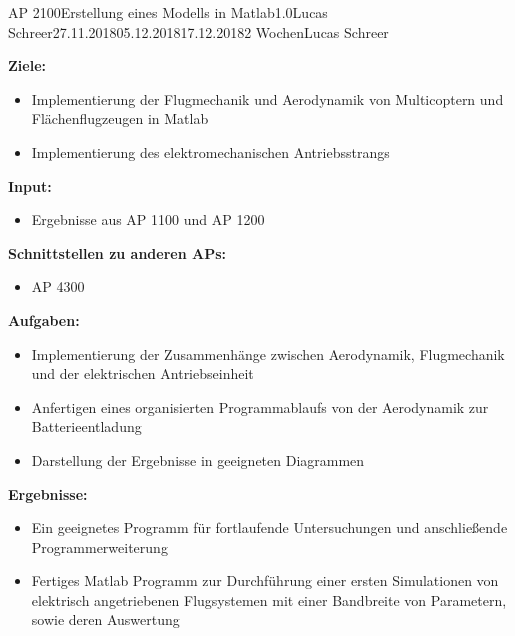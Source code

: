 \clearpage
\begin{wpd}{AP 2100}{Erstellung eines Modells in Matlab}{1.0}{Lucas Schreer}{27.11.2018}{05.12.2018}{17.12.2018}{2 Wochen}{Lucas Schreer}
    {
    \textbf{Ziele:}
    \begin{itemize}
        \item Implementierung der Flugmechanik und Aerodynamik von Multicoptern und Flächenflugzeugen in Matlab
        \item Implementierung des elektromechanischen Antriebsstrangs
    \end{itemize}
    \textbf{Input:}
    \begin{itemize}
        \item Ergebnisse aus AP 1100 und AP 1200
    \end{itemize}
    \textbf{Schnittstellen zu anderen APs:}
    \begin{itemize}
        \item AP 4300
    \end{itemize}
    \textbf{Aufgaben:}
    \begin{itemize}
    	\item Implementierung der Zusammenhänge zwischen Aerodynamik, Flugmechanik und der elektrischen Antriebseinheit
    	\item Anfertigen eines organisierten Programmablaufs von der Aerodynamik zur Batterieentladung
    	\item Darstellung der Ergebnisse in geeigneten Diagrammen
    \end{itemize}
    \textbf{Ergebnisse:}
    \begin{itemize}
        \item Ein geeignetes Programm für fortlaufende Untersuchungen und anschließende Programmerweiterung
        \item Fertiges Matlab Programm zur Durchführung einer ersten Simulationen von elektrisch angetriebenen Flugsystemen mit einer Bandbreite von Parametern, sowie deren Auswertung
    \end{itemize}
    }
\end{wpd}


